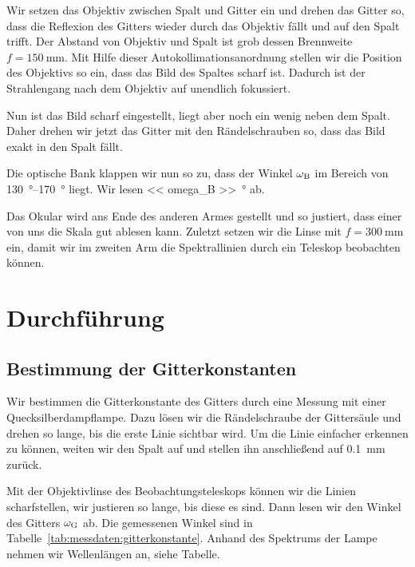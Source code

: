 Wir setzen das Objektiv zwischen Spalt und Gitter ein und drehen das Gitter so,
dass die Reflexion des Gitters wieder durch das Objektiv fällt und auf den
Spalt trifft. Der Abstand von Objektiv und Spalt ist grob dessen Brennweite $f
= \SI{150}{\milli\meter}$. Mit Hilfe dieser Autokollimationsanordnung stellen
wir die Position des Objektivs so ein, dass das Bild des Spaltes scharf ist.
Dadurch ist der Strahlengang nach dem Objektiv auf unendlich fokussiert.

Nun ist das Bild scharf eingestellt, liegt aber noch ein wenig neben dem Spalt.
Daher drehen wir jetzt das Gitter mit den Rändelschrauben so, dass das Bild
exakt in den Spalt fällt.

Die optische Bank klappen wir nun so zu, dass der Winkel $\omega_\text B$ im
Bereich von \SIrange{130}{170}{\degree} liegt. Wir lesen \SI{<< omega_B
>>}{\degree} ab.

Das Okular wird ans Ende des anderen Armes gestellt und so justiert, dass einer
von uns die Skala gut ablesen kann. Zuletzt setzen wir die Linse mit $f =
\SI{300}{\milli\meter}$ ein, damit wir im zweiten Arm die Spektrallinien durch
ein Teleskop beobachten können.

\FloatBarrier
\section{Durchführung}

\FloatBarrier
\subsection{Bestimmung der Gitterkonstanten}
\label{sec:gitterkonstante/durchführung}

Wir bestimmen die Gitterkonstante des Gitters durch eine Messung mit einer
Quecksilberdampflampe. Dazu lösen wir die Rändelschraube der Gittersäule und
drehen so lange, bis die erste Linie sichtbar wird. Um die Linie einfacher
erkennen zu können, weiten wir den Spalt auf und stellen ihn anschließend auf
\SI{0.1}{\milli\meter} zurück.

Mit der Objektivlinse des Beobachtungsteleskops können wir die Linien
scharfstellen, wir justieren so lange, bis diese es sind. Dann lesen wir den
Winkel des Gitters
$\omega_\text G$ ab. Die gemessenen Winkel sind in
Tabelle~\ref{tab:messdaten:gitterkonstante}. Anhand des Spektrums der Lampe
nehmen wir Wellenlängen an, siehe Tabelle.

